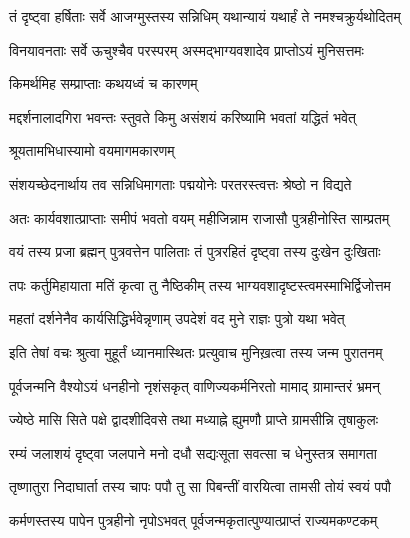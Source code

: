 \twolineshloka
{तं दृष्ट्वा हर्षिताः सर्वे आजग्मुस्तस्य सन्निधिम्}
{यथान्यायं यथार्हं ते नमश्चक्रुर्यथोदितम्} %

\twolineshloka
{विनयावनताः सर्वे ऊचुश्चैव परस्परम्}
{अस्मद्भाग्यवशादेव प्राप्तोऽयं मुनिसत्तमः} %



\onelineshloka
{किमर्थमिह सम्प्राप्ताः कथयध्वं च कारणम्} %

\twolineshloka
{मद्दर्शनालादगिरा भवन्तः स्तुवते किमु}
{असंशयं करिष्यामि भवतां यद्धितं भवेत्} %



\onelineshloka
{श्रूयतामभिधास्यामो वयमागमकारणम्} %

\twolineshloka
{संशयच्छेदनार्थाय तव सन्निधिमागताः}
{पद्मयोनेः परतरस्त्वत्तः श्रेष्ठो न विद्यते} %

\twolineshloka
{अतः कार्यवशात्प्राप्ताः समीपं भवतो वयम्}
{महीजिन्नाम राजासौ पुत्रहीनोस्ति साम्प्रतम्} %

\twolineshloka
{वयं तस्य प्रजा ब्रह्मन् पुत्रवत्तेन पालिताः}
{तं पुत्ररहितं दृष्ट्वा तस्य दुःखेन दुःखिताः} %

\twolineshloka
{तपः कर्तुमिहायाता मतिं कृत्वा तु नैष्ठिकीम्}
{तस्य भाग्यवशादृष्टस्त्वमस्माभिर्द्विजोत्तम} %

\twolineshloka
{महतां दर्शनेनैव कार्यसिद्धिर्भवेन्नृणाम्}
{उपदेशं वद मुने राज्ञः पुत्रो यथा भवेत्} %

\twolineshloka
{इति तेषां वचः श्रुत्वा मुहूर्तं ध्यानमास्थितः}
{प्रत्युवाच मुनिख़त्वा तस्य जन्म पुरातनम्} %


\twolineshloka
{पूर्वजन्मनि वैश्योऽयं धनहीनो नृशंसकृत्}
{वाणिज्यकर्मनिरतो मामाद् ग्रामान्तरं भ्रमन्} %

\twolineshloka
{ज्येष्ठे मासि सिते पक्षे द्वादशीदिवसे तथा}
{मध्याह्ने ह्युमणौ प्राप्ते ग्रामसीन्नि तृषाकुलः} %

\twolineshloka
{रम्यं जलाशयं दृष्ट्वा जलपाने मनो दधौ}
{सद्यःसूता सवत्सा च धेनुस्तत्र समागता} %

\twolineshloka
{तृष्णातुरा निदाघार्ता तस्य चापः पपौ तु सा}
{पिबन्तीं वारयित्वा तामसी तोयं स्वयं पपौ} %

\twolineshloka
{कर्मणस्तस्य पापेन पुत्रहीनो नृपोऽभवत्}
{पूर्वजन्मकृतात्पुण्यात्प्राप्तं राज्यमकण्टकम्} %

